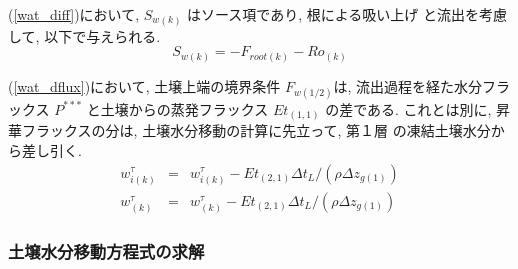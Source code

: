 (\ref{wat_diff})において, $S_{w(k)}$ はソース項であり, 根による吸い上げ
と流出を考慮して, 以下で与えられる. 
\begin{equation}
 S_{w(k)} = - F_{root(k)} - Ro_{(k)}
\end{equation}

(\ref{wat_dflux})において, 
土壌上端の境界条件 $F_{w(1/2)}$は, 流出過程を経た水分フラックス
$P^{***}$ と土壌からの蒸発フラックス $Et_{(1,1)}$ の差である. 
これとは別に, 昇華フラックスの分は, 土壌水分移動の計算に先立って, 第１層
の凍結土壌水分から差し引く. 
\begin{eqnarray}
 w_{i(k)}^{\tau} &=& w_{i(k)}^{\tau} - Et_{(2,1)} \Delta t_L /(\rho \Delta z_{g(1)})\\
 w_{(k)}^{\tau} &=& w_{(k)}^{\tau} - Et_{(2,1)} \Delta t_L /(\rho \Delta z_{g(1)})
\end{eqnarray}

\subsubsection{土壌水分移動方程式の求解}

